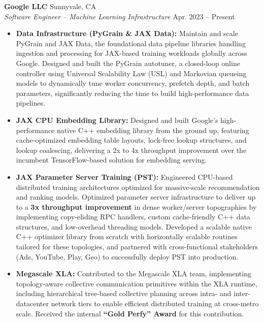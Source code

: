 \documentclass[10pt,letterpaper]{article}
\newcommand{\resumeItem}[1]{\item\small{#1}}
\newcommand{\resumeHeading}[4]{
  \noindent\textbf{#1} \hfill #2 \\
  \noindent\textit{#3} \hfill \small{#4} \\
  \vspace{2pt}
}
\begin{document}
\resumeHeading{Google LLC}{Sunnyvale, CA}{Software Engineer -- Machine Learning Infrastructure}{Apr. 2023 -- Present}
\begin{itemize}[itemsep=4pt]
    \resumeItem{\textbf{Data Infrastructure (PyGrain \& JAX Data):} Maintain and scale PyGrain and JAX Data, the foundational data pipeline libraries handling ingestion and processing for JAX-based training workloads globally across Google. Designed and built the PyGrain autotuner, a closed-loop online controller using Universal Scalability Law (USL) and Markovian queueing models to dynamically tune worker concurrency, prefetch depth, and batch parameters, significantly reducing the time to build high-performance data pipelines.}
    \resumeItem{\textbf{JAX CPU Embedding Library:} Designed and built Google's high-performance native C++ embedding library from the ground up, featuring cache-optimized embedding table layouts, lock-free lookup structures, and lookup coalescing, delivering a 2x to 4x throughput improvement over the incumbent TensorFlow-based solution for embedding serving.}
    \resumeItem{\textbf{JAX Parameter Server Training (PST):} Engineered CPU-based distributed training architectures optimized for massive-scale recommendation and ranking models. Optimized parameter server infrastructure to deliver up to a \textbf{3x throughput improvement} in dense worker/server topographies by implementing copy-eliding RPC handlers, custom cache-friendly C++ data structures, and low-overhead threading models. Developed a scalable native C++ optimizer library from scratch with horizontally scalable routines tailored for these topologies, and partnered with cross-functional stakeholders (Ads, YouTube, Play, Geo) to successfully deploy PST into production.}
    \resumeItem{\textbf{Megascale XLA:} Contributed to the Megascale XLA team, implementing topology-aware collective communication primitives within the XLA runtime, including hierarchical tree-based collective planning across intra- and inter-datacenter network tiers to enable efficient distributed training at cross-metro scale. Received the internal \textbf{``Gold Perfy'' Award} for this contribution.}
\end{itemize}

\vspace{6pt}
\end{document}
